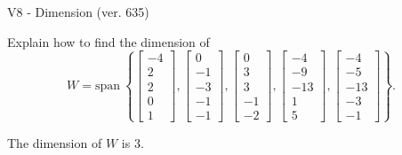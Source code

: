 \begin{exercise}
  \begin{exerciseTitle}V8 - Dimension (ver. 635)\end{exerciseTitle}
  \begin{exerciseStatement}
    Explain how to find the dimension of 
\[W=\mathrm{span}\ \left\{\left[\begin{array}{r}
-4 \\
2 \\
2 \\
0 \\
1
\end{array}\right] , \left[\begin{array}{r}
0 \\
-1 \\
-3 \\
-1 \\
-1
\end{array}\right] , \left[\begin{array}{r}
0 \\
3 \\
3 \\
-1 \\
-2
\end{array}\right] , \left[\begin{array}{r}
-4 \\
-9 \\
-13 \\
1 \\
5
\end{array}\right] , \left[\begin{array}{r}
-4 \\
-5 \\
-13 \\
-3 \\
-1
\end{array}\right]\right\}.\]



  \end{exerciseStatement}
  \begin{exerciseAnswer}
   The dimension of \(W\) is  \(3\).
  


  \end{exerciseAnswer}
\end{exercise}